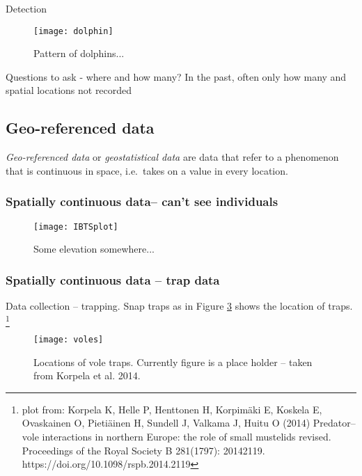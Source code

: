 Detection 
\begin{figure}
\begin{center}
\texttt{[image: dolphin]}
\caption{\label{fig:dolphins} Pattern of dolphins...}
\end{center}
\end{figure}

Questions to ask - where and how many? In the past, often only how many and spatial locations not recorded


\subsection{Geo-referenced data}
\textit{Geo-referenced data} or \textit{geostatistical data} are data that refer to a phenomenon that is continuous in space, i.e.\ takes on a value in every location.

\subsubsection{Spatially continuous data-- can't see individuals}\label{subsub:noindi}
\begin{figure}
\centering
\texttt{[image: IBTSplot]}
\caption{\label{fig:elev} Some elevation somewhere...}
\end{figure}

\subsubsection{Spatially continuous data -- trap data}
Data collection -- trapping. Snap traps as in
Figure \ref{fig:voles} shows the location of traps. \footnote{plot from: Korpela K, Helle P, Henttonen H, Korpimäki E, Koskela E, Ovaskainen O, Pietiäinen H, Sundell J, Valkama J, Huitu O (2014) Predator–vole interactions in northern Europe: the role of small mustelids revised. Proceedings of the Royal Society B 281(1797): 20142119. https://doi.org/10.1098/rspb.2014.2119}

\begin{figure}
\centering
\texttt{[image: voles]}
\caption{\label{fig:voles} Locations of vole traps. Currently figure is a place holder -- taken from Korpela et al. 2014.}
\end{figure}




